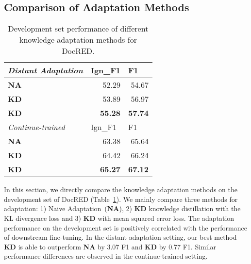 \documentclass[11pt]{article}
\begin{document}
\subsection{Comparison of Adaptation Methods}
\label{sec:compare-adaptation}



\begin{table}[ht]
\centering

\begin{tabular}{lrr} 
\hline
\textit{Distant Adaptation} & \multicolumn{1}{l}{Ign\_F1} & \multicolumn{1}{l}{F1}  \\ 
\hline
\textbf{NA}                 & 52.29                       & 54.67                             \\            
\textbf{KD}             & 53.89                       & 56.97                             \\
\textbf{KD}            & \textbf{55.28}                       & \textbf{57.74}                             \\
\hline
\textit{Continue-trained} & \multicolumn{1}{l}{Ign\_F1} & \multicolumn{1}{l}{F1}  \\ 
\hline
\textbf{NA}                 & 63.38                       & 65.64                              \\            
\textbf{KD}             & 64.42                       & 66.24                             \\
\textbf{KD}            & \textbf{65.27}                       & \textbf{67.12}                             \\
\hline
\end{tabular}
\setlength{\abovecaptionskip}{0pt}
\caption{Development set performance of different knowledge adaptation methods for DocRED.}
\label{tab:distant-results}
\end{table}


In this section, we directly compare the knowledge adaptation methods on the development set of DocRED (Table~\ref{tab:distant-results}). We mainly compare three methods for adaptation: 1) Naive Adaptation~(\textbf{NA}), 2) \textbf{KD} knowledge distillation with the KL divergence loss and 3) \textbf{KD} with mean squared error loss. The adaptation performance on the development set is positively correlated with the performance of downstream fine-tuning. In the distant adaptation setting, our best method \textbf{KD} is able to outperform \textbf{NA} by 3.07 F1 and \textbf{KD} by 0.77 F1. Similar performance differences are observed in the continue-trained setting.
\end{document}
